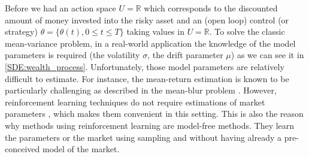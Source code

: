\documentclass[oneside, a4paper, onecolumn, 11pt]{article}
\begin{document}
Before we had an action space  $U =\mathbb{R}$ which corresponds to the discounted amount of money invested into the risky asset and an (open loop) control (or strategy) $\theta=\{\theta(t), 0\leq t \leq T\}$ taking values in $U =\mathbb{R}$. 
To solve the classic mean-variance problem, in a real-world application the knowledge of the model parameters is required (the volatility $\sigma$, the drift parameter $\mu$) as we can see it in \eqref{SDE:wealth_process}. Unfortunately, those model parameters are relatively difficult to estimate. For instance, the mean-return estimation is known to be particularly challenging as described in the mean-blur problem \cite{Luenberger1998}. However, reinforcement learning techniques do not require estimations of market parameters \cite{WangZhou2020}, which makes them convenient in this setting. This is also the reason why methods using reinforcement learning are model-free methods. They learn the parameters or the market using sampling and without having already a pre-conceived model of the market. 
\end{document}
